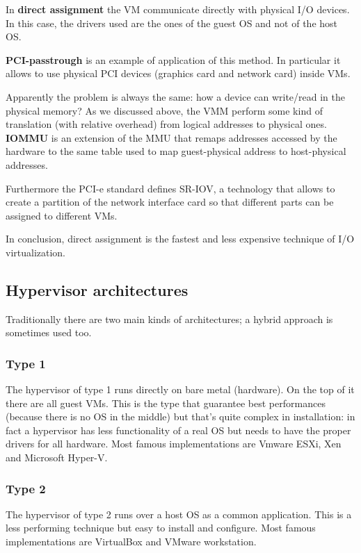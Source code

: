 In \textbf{direct assignment} the VM communicate directly with physical I/O devices. In this case, the drivers used are the ones of the guest OS and not of the host OS.

\textbf{PCI-passtrough} is an example of application of this method. In particular it allows to use physical PCI devices (graphics card and network card) inside VMs.

Apparently the problem is always the same: how a device can write/read in the physical memory?
As we discussed above, the VMM perform some kind of translation (with relative overhead) from logical addresses to physical ones. \textbf{IOMMU} is an extension of the MMU that remaps addresses accessed by the hardware to the same table used to map guest-physical address to host-physical addresses.

Furthermore the PCI-e standard defines SR-IOV, a technology that allows to create a partition of the network interface card so that different parts can be assigned to different VMs.

In conclusion, direct assignment is the fastest and less expensive technique of I/O virtualization.


\subsection{Hypervisor architectures}
Traditionally there are two main kinds of architectures; a hybrid approach is sometimes used too.

\subsubsection{Type 1}
The hypervisor of type 1 runs directly on bare metal (hardware). On the top of it there are all guest VMs.
This is the type that guarantee best performances (because there is no OS in the middle) but that's quite complex in installation: in fact a hypervisor has less functionality of a real OS but needs to have the proper drivers for all hardware.
Most famous implementations are Vmware ESXi, Xen and Microsoft Hyper-V.

\subsubsection{Type 2}
The hypervisor of type 2 runs over a host OS as a common application. This is a less performing technique but easy to install and configure. Most famous implementations are VirtualBox and VMware workstation.

